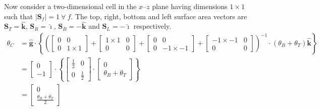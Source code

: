 \documentclass{article}
\newcommand{\vect}{\mathbf}
\newcommand{\iunit}{\boldsymbol{\hat \imath}}
\newcommand{\kunit}{\boldsymbol{\hat k}}
\newcommand{\Sf}{\vect{S}_f}
\newcommand{\Mag}[1]{\lvert #1 \rvert}
\newcommand{\magSf}{\Mag{\Sf}}
\newcommand{\gunit}{\vect{\hat{g}}}
\begin{document}
Now consider a two-dimensional cell in the $x$--$z$ plane having dimensions $1 \times 1$ such that $\magSf = 1\:\forall\:f$.  The top, right, bottom and left surface area vectors are $\vect{S}_T = \kunit$, $\vect{S}_R = \iunit$, $\vect{S}_B = - \kunit$ and $\vect{S}_L = - \iunit$ respectively.
\begin{align}
	\theta_C &= \gunit \cdot 
	\left\{
		\left( 
			\begin{bmatrix}0 & 0 \\ 0 & 1\times1\end{bmatrix} + 
			\begin{bmatrix}1\times1 & 0 \\ 0 & 0\end{bmatrix} + 
			\begin{bmatrix}0 & 0 \\ 0 & -1\times-1\end{bmatrix} + 
			\begin{bmatrix}-1\times-1 & 0 \\ 0 & 0\end{bmatrix}
		\right)^{-1}
		\cdot
		\left( \theta_B + \theta_T \right) \kunit
	\right\} \\
%
	&= \begin{bmatrix}0 \\ -1\end{bmatrix} \cdot
	\left\{
		\begin{bmatrix}\frac{1}{2} & 0 \\ 0 & \frac{1}{2}\end{bmatrix}
		\cdot
		\begin{bmatrix}0 \\ \theta_B + \theta_T\end{bmatrix}
	\right\} \\
%
	&= \begin{bmatrix}0 \\ \frac{\theta_B + \theta_T}{2} \end{bmatrix}
\end{align}
\end{document}
